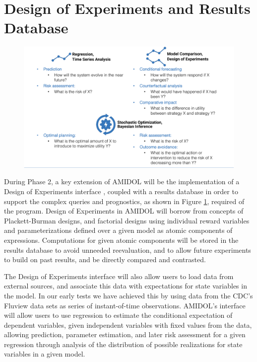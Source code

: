 \documentclass[11pt]{article}
\newcommand{\amidol}{\textsc{AMIDOL}}
\begin{document}
\section{Design of Experiments and Results Database}

\begin{figure}
  \includegraphics[width=\textwidth]{figs/table.pdf}
  \caption{}
  \label{Fig:InferenceClasses}
\end{figure}

During Phase 2, a key extension of \amidol{} will be the implementation of a Design of Experiments interface \cite{montgomery2017design}, coupled with a results database in order to support the complex queries and prognostics, as shown in Figure \ref{Fig:InferenceClasses}, required of the program.  Design of Experiments in \amidol{} will borrow from concepts of Plackett-Burman designs, and factorial designs using individual reward variables and parameterizations defined over a given model as atomic components of expressions.  Computations for given atomic components will be stored in the results database to avoid unneeded reevaluation, and to allow future experiments to build on past results, and be directly compared and contrasted.

The Design of Experiments interface will also allow users to load data from external sources, and associate this data with expectations for state variables in the model.  In our early tests we have achieved this by using data from the CDC's Fluview \cite{cdc2019fluview} data sets as series of instant-of-time observations.  \amidol{}'s interface will allow users to use regression to estimate the conditional expectation of dependent variables, given independent variables with fixed values from the data, allowing prediction, parameter estimation, and later risk assessment for a given regression through analysis of the distribution of possible realizations for state variables in a given model.
\end{document}
